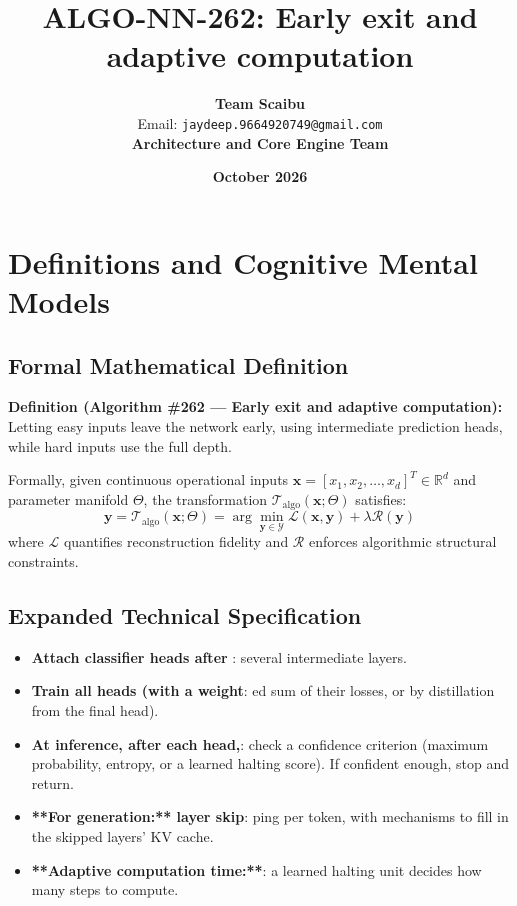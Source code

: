 \documentclass[11pt,a4paper]{article}
\title{\textbf{ALGO-NN-262: Early exit and adaptive computation}}
\author{\textbf{Team Scaibu} \\ \small Email: \texttt{jaydeep.9664920749@gmail.com} \\ \small \textbf{Architecture and Core Engine Team}}
\date{\textbf{October 2026}}
\theoremstyle{definition}
\begin{document}
\maketitle

\section{Definitions and Cognitive Mental Models}

\subsection{Formal Mathematical Definition}
\textbf{Definition (Algorithm \#262 --- Early exit and adaptive computation):}
Letting easy inputs leave the network early, using intermediate prediction heads, while hard inputs use the full depth.

Formally, given continuous operational inputs $\mathbf{x} = [x_1, x_2, \dots, x_d]^T \in \mathbb{R}^d$ and parameter manifold $\Theta$, the transformation $\mathcal{T}_{\text{algo}}(\mathbf{x}; \Theta)$ satisfies:
{\boldmath
\begin{equation}
\mathbf{y} = \mathcal{T}_{\text{algo}}(\mathbf{x}; \Theta) = \arg\min_{\mathbf{y} \in \mathcal{Y}} \mathcal{L}(\mathbf{x}, \mathbf{y}) + \lambda \mathcal{R}(\mathbf{y})
\end{equation}
}
where $\mathcal{L}$ quantifies reconstruction fidelity and $\mathcal{R}$ enforces algorithmic structural constraints.

\subsection{Expanded Technical Specification}
\begin{itemize}
\item \textbf{Attach classifier heads after }: several intermediate layers.
\item \textbf{Train all heads (with a weight}: ed sum of their losses, or by distillation from the final head).
\item \textbf{At inference, after each head,}:  check a confidence criterion (maximum probability, entropy, or a learned halting score). If confident enough, stop and return.
\item \textbf{**For generation:** layer skip}: ping per token, with mechanisms to fill in the skipped layers' KV cache.
\item \textbf{**Adaptive computation time:**}:  a learned halting unit decides how many steps to compute.
\end{itemize}
\end{document}
